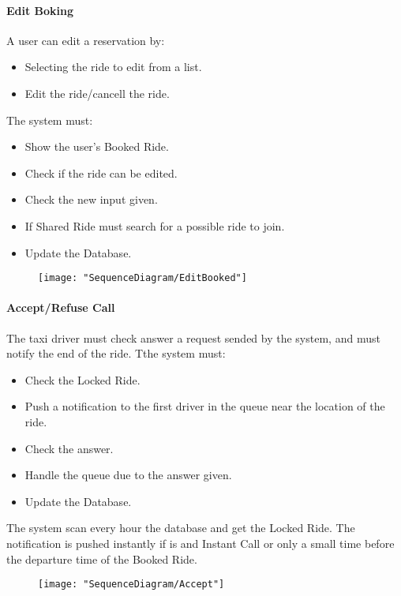 		\paragraph{Edit Boking}
			A user can edit a reservation by:\begin{itemize}
				\item Selecting the ride to edit from a list.
				\item Edit the ride/cancell the ride.
			\end{itemize}
			The system must:\begin{itemize}
				\item Show the user's Booked Ride.
				\item Check if the ride can be edited.
				\item Check the new input given.
				\item If Shared Ride must search for a possible ride to join\askpippo.
				\item Update the Database.
			\end{itemize}
				\newpage
				\begin{figure}[h!]
					\centering
					\texttt{[image: "SequenceDiagram/EditBooked"]}
				\end{figure}
				\newpage

			\paragraph{Accept/Refuse Call}
				The taxi driver must check answer a request sended by the system, and must notify the end of the ride.
				Tthe system must:\begin{itemize}
					\item Check the Locked Ride.
					\item Push a notification to the first driver in the queue near the location of the ride.
					\item Check the answer.
					\item Handle the queue due to the answer given.
					\item Update the Database.
				\end{itemize}
				The system scan every hour the database and get the Locked Ride.
				The notification is pushed instantly if is and Instant Call or only a small time before the departure time of the Booked Ride\askpippo.
				\newpage
				\begin{figure}
					\centering
					\texttt{[image: "SequenceDiagram/Accept"]}
				\end{figure}


